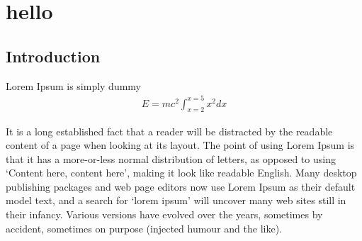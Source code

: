 
\part{hello}
\chapter{Introduction}  %

\ifpdf
    \graphicspath{{content/chapter1/figs/raster/}{content/chapter1/figs/pdf/}{content/chapter1/figs/}}
\else
    \graphicspath{{content/chapter1/figs/vector/}{content/chapter1/figs/}}
\fi



Lorem Ipsum is simply dummy \cite{stegmann_plastic_2022}
\begin{align}
    E = mc^2 \int_{x=2}^{x=5} x^2 dx
\end{align}



It is a long established fact that a reader will be distracted by the readable content of a page when looking at its layout. The point of using Lorem Ipsum is that it has a more-or-less normal distribution of letters, as opposed to using `Content here, content here', making it look like readable English. Many desktop publishing packages and web page editors now use Lorem Ipsum as their default model text, and a search for `lorem ipsum' will uncover many web sites still in their infancy. Various versions have evolved over the years, sometimes by accident, sometimes on purpose (injected humour and the like).

